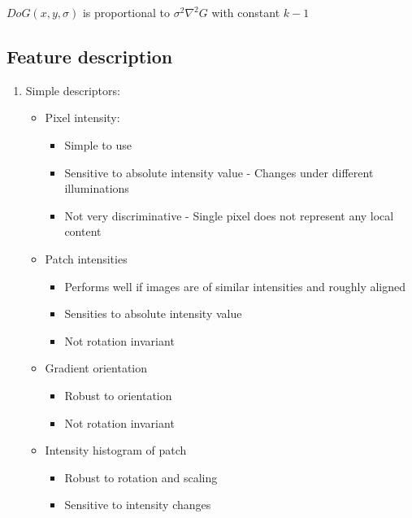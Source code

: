 \documentclass[9pt]{article}
\begin{document}
\begin{multicols*}{2}
\begin{enumerate}
            $DoG(x,y,\sigma)$ is proportional to $\sigma^2\nabla^2G$ with constant $k-1$
        \end{enumerate}

        \subsection{Feature description}
        \begin{enumerate}
            \item Simple descriptors:
            \begin{itemize}
                \item Pixel intensity: 
                \begin{itemize}
                    \item Simple to use 
                    \item Sensitive to absolute intensity value - Changes under different illuminations 
                    \item Not very discriminative - Single pixel does not represent any local content
                \end{itemize}

                \item Patch intensities 
                \begin{itemize}
                    \item Performs well if images are of similar intensities and roughly aligned 
                    \item Sensities to absolute intensity value 
                    \item Not rotation invariant 
                \end{itemize}

                \item Gradient orientation 
                \begin{itemize}
                    \item Robust to orientation 
                    \item Not rotation invariant 
                \end{itemize}

                \item Intensity histogram of patch 
                \begin{itemize}
                    \item Robust to rotation and scaling 
                    \item Sensitive to intensity changes 
                \end{itemize}
            \end{itemize}
        \end{enumerate}


\end{multicols*}
\end{document}
